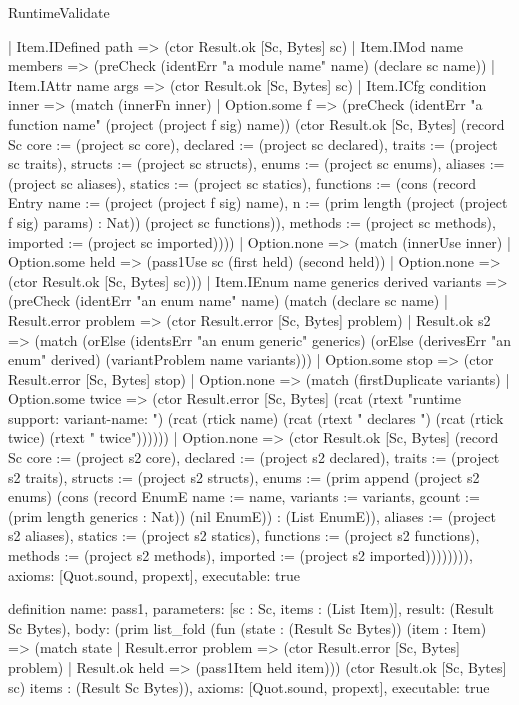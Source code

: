 \begin{lexlean}{RuntimeValidate}
\begin{semanticmodule}
{    | Item.IDefined path => (ctor Result.ok [Sc, Bytes] sc)
    | Item.IMod name members => (preCheck (identErr "a module name" name) (declare sc name))
    | Item.IAttr name args => (ctor Result.ok [Sc, Bytes] sc)
    | Item.ICfg condition inner => (match (innerFn inner)
      | Option.some f => (preCheck (identErr "a function name" (project (project f sig) name)) (ctor Result.ok [Sc, Bytes] (record Sc {core := (project sc core), declared := (project sc declared), traits := (project sc traits), structs := (project sc structs), enums := (project sc enums), aliases := (project sc aliases), statics := (project sc statics), functions := (cons (record Entry {name := (project (project f sig) name), n := (prim length (project (project f sig) params) : Nat)}) (project sc functions)), methods := (project sc methods), imported := (project sc imported)})))
      | Option.none => (match (innerUse inner)
        | Option.some held => (pass1Use sc (first held) (second held))
        | Option.none => (ctor Result.ok [Sc, Bytes] sc)))
    | Item.IEnum name generics derived variants => (preCheck (identErr "an enum name" name) (match (declare sc name)
      | Result.error problem => (ctor Result.error [Sc, Bytes] problem)
      | Result.ok s2 => (match (orElse (identsErr "an enum generic" generics) (orElse (derivesErr "an enum" derived) (variantProblem name variants)))
        | Option.some stop => (ctor Result.error [Sc, Bytes] stop)
        | Option.none => (match (firstDuplicate variants)
          | Option.some twice => (ctor Result.error [Sc, Bytes] (rcat (rtext "runtime support: variant-name: ") (rcat (rtick name) (rcat (rtext " declares ") (rcat (rtick twice) (rtext " twice"))))))
          | Option.none => (ctor Result.ok [Sc, Bytes] (record Sc {core := (project s2 core), declared := (project s2 declared), traits := (project s2 traits), structs := (project s2 structs), enums := (prim append (project s2 enums) (cons (record EnumE {name := name, variants := variants, gcount := (prim length generics : Nat)}) (nil EnumE)) : (List EnumE)), aliases := (project s2 aliases), statics := (project s2 statics), functions := (project s2 functions), methods := (project s2 methods), imported := (project s2 imported)}))))))),
  axioms: [Quot.sound, propext],
  executable: true
}

definition{
  name: pass1,
  parameters: [sc : Sc, items : (List Item)],
  result: (Result Sc Bytes),
  body: (prim list_fold (fun (state : (Result Sc Bytes)) (item : Item) => (match state
    | Result.error problem => (ctor Result.error [Sc, Bytes] problem)
    | Result.ok held => (pass1Item held item))) (ctor Result.ok [Sc, Bytes] sc) items : (Result Sc Bytes)),
  axioms: [Quot.sound, propext],
  executable: true
}


\end{semanticmodule}
\end{lexlean}
